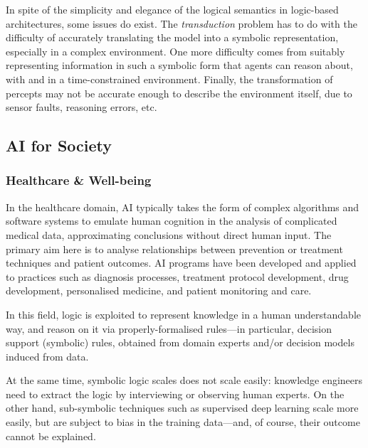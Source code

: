 \documentclass[12pt,a4paper,openright,twoside]{book}
\begin{document}
In spite of the simplicity and elegance of the logical semantics in logic-based architectures, some issues do exist.
%
The \emph{transduction} problem\cite{bie2004} has to do with the difficulty of accurately translating the model into a symbolic representation, especially in a complex environment.
%
One more difficulty comes from suitably representing information in such a symbolic form that agents can reason about, with and in a time-constrained environment.
%
Finally, the transformation of percepts may not be accurate enough to describe the environment itself, due to sensor faults, reasoning errors, etc.

\subsection{AI for Society}\label{ssec:ai-society}

\subsubsection{Healthcare \& Well-being}

In the healthcare domain, AI typically takes the form of complex algorithms and software systems to emulate human cognition in the analysis of complicated medical data, approximating conclusions without direct human input.
%
The primary aim here is to analyse relationships between prevention or treatment techniques and patient outcomes. AI programs have been developed and applied to practices such as diagnosis processes, treatment protocol development, drug development, personalised medicine, and patient monitoring and care.

In this field, logic is exploited to represent knowledge in a human understandable way, and reason on it via properly-formalised rules---in particular, decision support (symbolic) rules, obtained from domain experts and/or decision models induced from data.

At the same time, symbolic logic scales does not scale easily: knowledge engineers need to extract the logic by interviewing or observing human experts.
%
On the other hand, sub-symbolic techniques such as supervised deep learning scale more easily, but are subject to bias in the training data---and, of course, their outcome cannot be explained.
\end{document}
